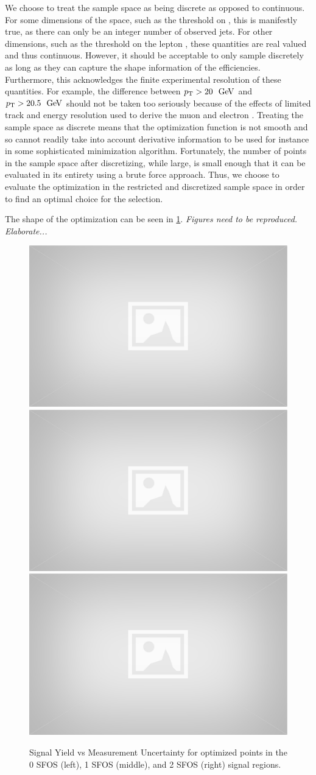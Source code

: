 We choose to treat the sample space as being discrete as opposed
to continuous. For some dimensions of the space, such as 
the threshold on \njet, this is manifestly true, as there 
can only be an integer number of observed jets. 
For other dimensions, such as the threshold on the lepton
\pt, these quantities are real valued and thus continuous.
However, 
it should be acceptable to only sample 
discretely as long as they can capture the shape information of 
the efficiencies. %
Furthermore, 
this acknowledges the finite  experimental resolution of these 
quantities. For example,
the difference between $\pt > 20~\GeV$ and $\pt > 20.5~\GeV$
should not be taken too seriously because of the effects of limited
track and energy resolution used to derive the muon and electron \pt.
Treating the sample space as discrete means that the optimization
function is not smooth and so cannot readily take into account
derivative information to be used for instance 
in some sophisticated minimization algorithm.
Fortunately, the number of points in the sample space after discretizing, 
while large, is small enough that it can be evaluated in its entirety
using a brute force approach. Thus, we choose to evaluate the 
optimization in the restricted and discretized sample space in order
to find an optimal choice for the selection.


The shape of the optimization can be seen in \fig\ref{fig:optimization}.
\emph{Figures need to be reproduced. Elaborate...} 


\begin{figure}[ht!]
\centering
\includegraphics[width=0.3\columnwidth]{figures/placeholder.eps}
\includegraphics[width=0.3\columnwidth]{figures/placeholder.eps}
\includegraphics[width=0.3\columnwidth]{figures/placeholder.eps}
\caption{Signal Yield vs Measurement Uncertainty for optimized points 
in the 0 SFOS (left), 1 SFOS (middle), and 2 SFOS (right) signal regions.}
\label{fig:optimization}
\end{figure}


